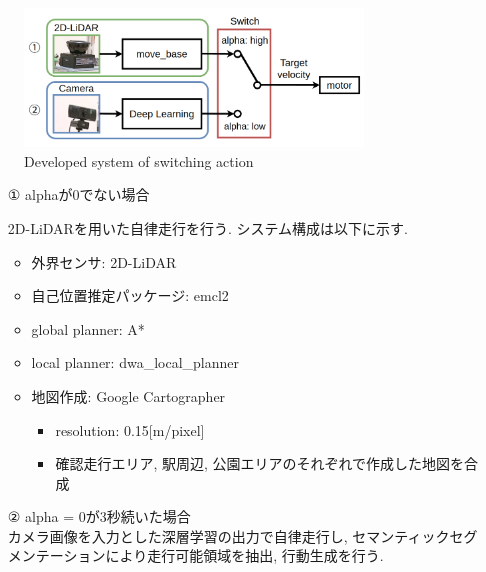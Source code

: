 \documentclass[uplatex, twocolumn, 9pt]{jsproceedings}
\begin{document}
\begin{figure}[h]
  \centering
  \includegraphics[width=90mm]{fig/switching3.pdf}
  \caption{Developed system of switching action}
  \label{fig:switching}%
\end{figure}

\begin{itemize}
  \item [①]alphaが0でない場合\par
  2D-LiDARを用いた自律走行を行う. システム構成は以下に示す. 
  \begin{itemize}
    \item 外界センサ: 2D-LiDAR
    \item 自己位置推定パッケージ: emcl2
    \item global planner: A*
    \item local planner: dwa\_local\_planner
    \item 地図作成: Google Cartographer
    \begin{itemize}
      \item resolution: 0.15[m/pixel]
      \item 確認走行エリア, 駅周辺, 公園エリアのそれぞれで作成した地図を合成
    \end{itemize}
  \end{itemize}
  \item [②]alpha = 0が3秒続いた場合\\
  カメラ画像を入力とした深層学習の出力で自律走行し, セマンティックセグメンテーション\cite{Deeplab}により走行可能領域を抽出, 行動生成を行う. \\
\end{itemize}
\end{document}

